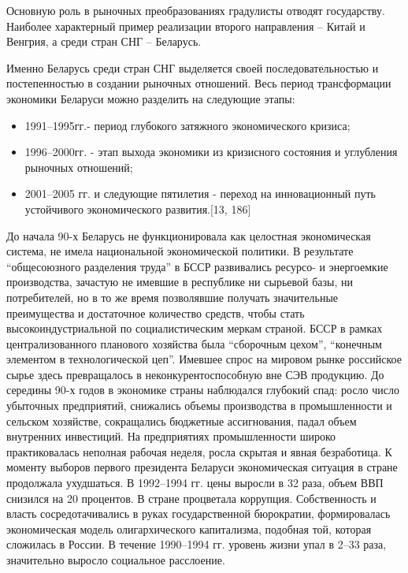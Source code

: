 \documentclass[14pt,a4paper]{article}
\begin{document}
    Основную роль в рыночных преобразованиях градулисты отводят государству.
    Наиболее характерный пример реализации второго направления – Китай и Венгрия, а среди стран СНГ – Беларусь.
    \par
    Именно Беларусь среди стран СНГ выделяется своей последовательностью и постепенностью в создании рыночных отношений.
    Весь период трансформации экономики Беларуси можно разделить на следующие этапы:
    \begin{itemize}
        \item 1991--1995гг.- период глубокого затяжного экономического кризиса;
        \item 1996--2000гг. - этап выхода экономики из кризисного состояния и углубления рыночных отношений;
        \item 2001--2005 гг. и следующие пятилетия - переход на инновационный путь устойчивого экономического развития.[13, 186]
    \end{itemize}
    \par
    До начала 90-х Беларусь не функционировала как целостная экономическая система, не имела национальной экономической политики.
    В результате ``общесоюзного разделения труда'' в БССР развивались ресурсо- и энергоемкие производства, зачастую не имевшие в республике ни сырьевой базы, ни потребителей, но в то же время позволявшие получать значительные преимущества и достаточное количество средств, чтобы стать высокоиндустриальной по социалистическим меркам страной.
    БССР в рамках централизованного планового хозяйства была ``сборочным цехом'', ``конечным элементом в технологической цеп''.
    Имевшее спрос на мировом рынке российское сырье здесь превращалось в неконкурентоспособную вне СЭВ продукцию.
    До середины 90-х годов в экономике страны наблюдался глубокий спад: росло число убыточных предприятий, снижались объемы производства в промышленности и сельском хозяйстве, сокращались бюджетные ассигнования, падал объем внутренних инвестиций.
    На предприятиях промышленности широко практиковалась неполная рабочая неделя, росла скрытая и явная безработица.
    К моменту выборов первого президента Беларуси экономическая ситуация в стране продолжала ухудшаться.
    В 1992--1994 гг. цены выросли в 32 раза, объем ВВП снизился на 20 процентов.
    В стране процветала коррупция. Собственность и власть сосредотачивались в руках государственной бюрократии, формировалась экономическая модель олигархического капитализма, подобная той, которая сложилась в России.
    В течение 1990--1994 гг. уровень жизни упал в 2--33 раза, значительно выросло социальное расслоение.
\end{document}
